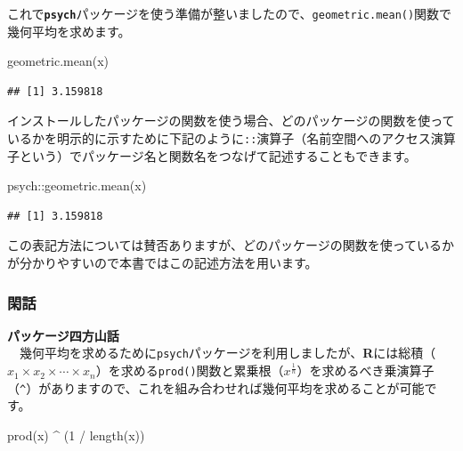 \documentclass[
  12pt,
]{book}
\newenvironment{Shaded}{\begin{snugshade}}{\end{snugshade}}
\newcommand{\DecValTok}[1]{\textcolor[rgb]{0.00,0.00,0.81}{#1}}
\newcommand{\FunctionTok}[1]{\textcolor[rgb]{0.00,0.00,0.00}{#1}}
\newcommand{\NormalTok}[1]{#1}
\newcommand{\SpecialCharTok}[1]{\textcolor[rgb]{0.00,0.00,0.00}{#1}}
\begin{document}
これで\textbf{\texttt{psych}}パッケージを使う準備が整いましたので、\texttt{geometric.mean()}関数で幾何平均を求めます。

\begin{Shaded}
\begin{Highlighting}[numbers=left,,]
\FunctionTok{geometric.mean}\NormalTok{(x)}
\end{Highlighting}
\end{Shaded}

\begin{verbatim}
## [1] 3.159818
\end{verbatim}

インストールしたパッケージの関数を使う場合、どのパッケージの関数を使っているかを明示的に示すために下記のように\texttt{::}演算子（名前空間へのアクセス演算子という）でパッケージ名と関数名をつなげて記述することもできます。

\begin{Shaded}
\begin{Highlighting}[numbers=left,,]
\NormalTok{psych}\SpecialCharTok{::}\FunctionTok{geometric.mean}\NormalTok{(x)}
\end{Highlighting}
\end{Shaded}

\begin{verbatim}
## [1] 3.159818
\end{verbatim}

この表記方法については賛否ありますが、どのパッケージの関数を使っているかが分かりやすいので本書ではこの記述方法を用います。

\hypertarget{ux9591ux8a71}{%
\subsubsection*{閑話}\label{ux9591ux8a71}}

\textbf{パッケージ四方山話}\\
　幾何平均を求めるために\texttt{psych}パッケージを利用しましたが、\textbf{R}には総積（\(x_1 \times x_2 \times \cdots \times x_n\)）を求める\texttt{prod()}関数と累乗根（\(x^{\frac{1}{n}}\)）を求めるべき乗演算子（\texttt{\^{}}）がありますので、これを組み合わせれば幾何平均を求めることが可能です。

\begin{Shaded}
\begin{Highlighting}[numbers=left,,]
\FunctionTok{prod}\NormalTok{(x) }\SpecialCharTok{\^{}}\NormalTok{ (}\DecValTok{1} \SpecialCharTok{/} \FunctionTok{length}\NormalTok{(x))}
\end{Highlighting}
\end{Shaded}
\end{document}
